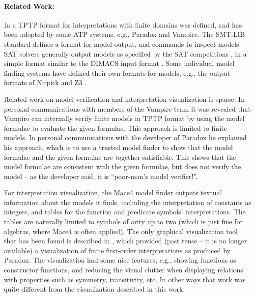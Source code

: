 \documentclass[letterpaper]{article}
\begin{document}
\paragraph{Related Work:}
In \cite{SS+06} a TPTP format for interpretations with finite domains was defined, and has been 
adopted by some ATP systems, e.g., Paradox and Vampire.
The SMT-LIB standard \cite{BFT17} defines a format for model output, and commands to inspect 
models.  
SAT solvers generally output models as specified by the SAT competitions \cite{JL+12}, in a 
simple format similar to the DIMACS input format \cite{Bab93}.
Some individual model finding systems have defined their own formats for models, e.g., the 
output formats of Nitpick and Z3 \cite{dMB08}.

Related work on model verification and interpretation visualization is sparse.
In personal communications with members of the Vampire team it was revealed that Vampire can 
internally verify finite models in TPTP format by using the model formulae to evaluate the given 
formulae.
This approach 
is limited to finite models.
In personal communications with the developer of Paradox he explained his approach, which is to 
use a trusted model finder to show that the model formulae and the given formulae are together 
satisfiable.
This shows that the model formulae are consistent with the given formulae, but does not verify 
the model -- as the developer said, it is ``poor-man's model verifier!''.

For interpretation visualization, the Mace4 model finder \cite{McC03-MACE4-TR} outputs textual 
information about the models it finds, including the interpretation of constants as integers,
and tables for the function and predicate symbols' interpretations. 
The tables are naturally limited to symbols of arity up to two (which is just fine for algebras, 
where Mace4 is often applied).
The only graphical visualization tool that has been found is described in \cite{Sch13-MS},
which provided (past tense -- it is no longer available) a visualization of finite first-order 
interpretations as produced by Paradox.
The visualization had some nice features, e.g., showing functions as constructor functions, and 
reducing the visual clutter when displaying relations with properties such as symmetry, 
transitivity, etc.
In other ways that work was quite different from the visualization described in this work.
\end{document}
